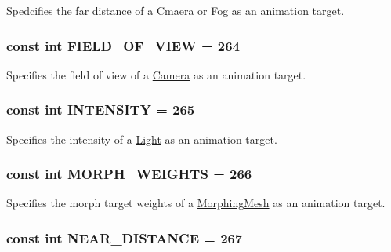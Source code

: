 Spedcifies the far distance of a Cmaera or \hyperlink{classm3g_1_1Fog}{Fog} as an animation target. \hypertarget{classm3g_1_1AnimationTrack_94c1c1d2f7d48b52e3c2bcd332ed3937}{
\subsubsection[{FIELD\_\-OF\_\-VIEW}]{\setlength{\rightskip}{0pt plus 5cm}const int {\bf FIELD\_\-OF\_\-VIEW} = 264}}
\label{classm3g_1_1AnimationTrack_94c1c1d2f7d48b52e3c2bcd332ed3937}


Specifies the field of view of a \hyperlink{classm3g_1_1Camera}{Camera} as an animation target. \hypertarget{classm3g_1_1AnimationTrack_369fe8830f39fe4aec819a371a6c9904}{
\subsubsection[{INTENSITY}]{\setlength{\rightskip}{0pt plus 5cm}const int {\bf INTENSITY} = 265}}
\label{classm3g_1_1AnimationTrack_369fe8830f39fe4aec819a371a6c9904}


Specifies the intensity of a \hyperlink{classm3g_1_1Light}{Light} as an animation target. \hypertarget{classm3g_1_1AnimationTrack_d75f3e3033e268d0a74f9533cfa9b9d6}{
\subsubsection[{MORPH\_\-WEIGHTS}]{\setlength{\rightskip}{0pt plus 5cm}const int {\bf MORPH\_\-WEIGHTS} = 266}}
\label{classm3g_1_1AnimationTrack_d75f3e3033e268d0a74f9533cfa9b9d6}


Specifies the morph target weights of a \hyperlink{classm3g_1_1MorphingMesh}{MorphingMesh} as an animation target. \hypertarget{classm3g_1_1AnimationTrack_74f49e3b52778aff378dac012e59cdb2}{
\subsubsection[{NEAR\_\-DISTANCE}]{\setlength{\rightskip}{0pt plus 5cm}const int {\bf NEAR\_\-DISTANCE} = 267}}
\label{classm3g_1_1AnimationTrack_74f49e3b52778aff378dac012e59cdb2}



